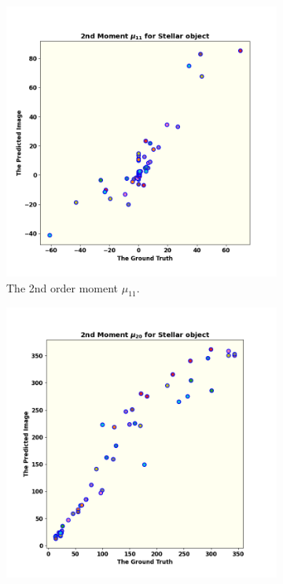 \begin{figure}
	\centering
	\begin{subfigure}{0.33\linewidth}
		\includegraphics[width=\linewidth]{fig/moments/mom3.png}
		\caption{The 2nd order moment $\mu_{11}$.}
		\label{fig:mom4}
	\end{subfigure}\hfill
	\begin{subfigure}{0.33\linewidth}
		\includegraphics[width=\linewidth]{fig/moments/mom4.png}

\end{subfigure}
\end{figure}
